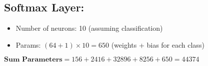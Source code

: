 \documentclass{article}
\begin{document}
\begin{latin}
\subsection*{Softmax Layer:}
\begin{itemize}
    \item Number of neurons: 10 (assuming classification)
    \item Params: $(64 + 1) \times 10 = 650$ (weights + bias for each class)
\end{itemize}

$\textbf{Sum Parameters} = 156 + 2416 + 32896 + 8256 + 650 = 44374$

\end{latin}


\section{}
\end{document}

